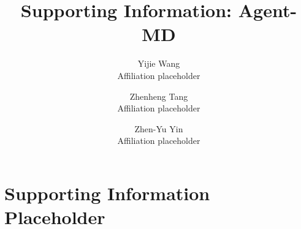 \documentclass[11pt]{article}
\title{Supporting Information: Agent-MD}
\author{Yijie Wang\\Affiliation placeholder}
\author{Zhenheng Tang\\Affiliation placeholder}
\author{Zhen-Yu Yin\\Affiliation placeholder}
\date{}
\begin{document}
\maketitle

\section{Supporting Information Placeholder}
\end{document}

